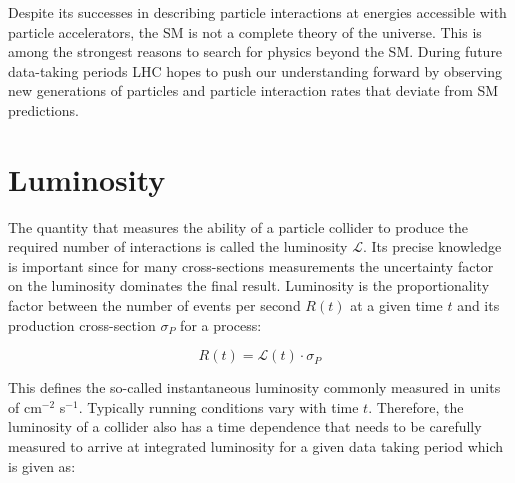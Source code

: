 Despite its successes in describing particle interactions at energies accessible with particle accelerators, the SM is not a complete theory of the universe. This is among the strongest reasons to search for physics beyond the SM. During future data-taking periods LHC hopes to push our understanding forward by observing new generations of particles and particle interaction rates that deviate from SM predictions.




%






\section{Luminosity}

The quantity that measures the ability of a particle collider to produce the required number of interactions is called the luminosity $\mathcal{L}$. Its precise knowledge is important since for many cross-sections measurements the uncertainty factor on the luminosity dominates the final result. Luminosity is the proportionality factor between the number of events per second $R(t)$ at a given time $t$ and its production cross-section $\sigma_{P}$ for a process:

\begin{equation} \label{eq:rate}
R(t) = \mathcal{L}(t) \cdot \sigma_{P}
\end{equation}

This defines the so-called instantaneous luminosity commonly measured in units of cm$^{-2}$ s$^{-1}$. Typically running conditions vary with time $t$. Therefore, the luminosity of a collider also has a time dependence that needs to be carefully measured to arrive at integrated luminosity for a given data taking period which is given as:

